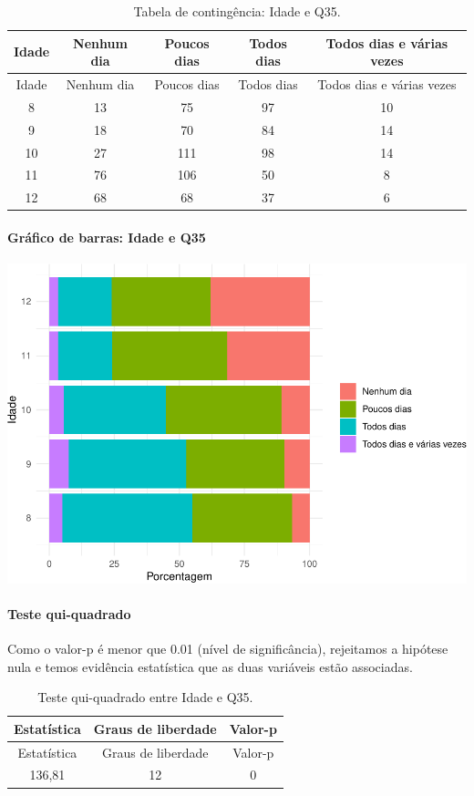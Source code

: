 \documentclass[]{article}
\let\oldparagraph\paragraph
\renewcommand{\paragraph}[1]{\oldparagraph{#1}\mbox{}}
\begin{document}
\begin{longtable}[]{@{}ccccc@{}}
\caption{\label{tab:unnamed-chunk-1272}Tabela de contingência: Idade e Q35.}\tabularnewline
\toprule
Idade & Nenhum dia & Poucos dias & Todos dias & Todos dias e várias vezes\tabularnewline
\midrule
\endfirsthead
\toprule
Idade & Nenhum dia & Poucos dias & Todos dias & Todos dias e várias vezes\tabularnewline
\midrule
\endhead
8 & 13 & 75 & 97 & 10\tabularnewline
9 & 18 & 70 & 84 & 14\tabularnewline
10 & 27 & 111 & 98 & 14\tabularnewline
11 & 76 & 106 & 50 & 8\tabularnewline
12 & 68 & 68 & 37 & 6\tabularnewline
\bottomrule
\end{longtable}

\hypertarget{gruxe1fico-de-barras-idade-e-q35}{%
\paragraph{Gráfico de barras: Idade e Q35}\label{gruxe1fico-de-barras-idade-e-q35}}

\begin{center}\includegraphics[width=0.75\linewidth]{relatorio_covid19_files/figure-latex/unnamed-chunk-1273-1} \end{center}

\hypertarget{teste-qui-quadrado-109}{%
\paragraph{Teste qui-quadrado}\label{teste-qui-quadrado-109}}

Como o valor-p é menor que 0.01 (nível de significância), rejeitamos a hipótese nula e temos evidência estatística que as duas variáveis estão associadas.

\begin{longtable}[]{@{}ccc@{}}
\caption{\label{tab:unnamed-chunk-1275}Teste qui-quadrado entre Idade e Q35.}\tabularnewline
\toprule
Estatística & Graus de liberdade & Valor-p\tabularnewline
\midrule
\endfirsthead
\toprule
Estatística & Graus de liberdade & Valor-p\tabularnewline
\midrule
\endhead
136,81 & 12 & 0\tabularnewline
\bottomrule
\end{longtable}
\end{document}
